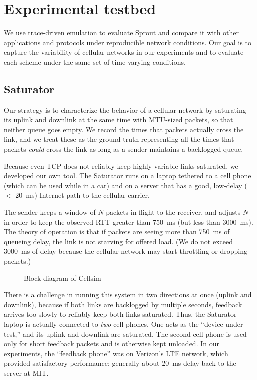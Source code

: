 \section{Experimental testbed}
\label{s:impl}
\label{ss:platform}
We use trace-driven emulation to evaluate Sprout and compare it with
other applications and protocols under reproducible network
conditions. Our goal is to capture the variability of cellular
networks in our experiments and to evaluate each scheme under the same
set of time-varying conditions.

\subsection{Saturator} Our strategy is to characterize the behavior
of a cellular network by saturating its uplink and downlink at the
same time with MTU-sized packets, so that neither queue goes empty. We
record the times that packets actually cross the link, and we treat
these as the ground truth representing all the times that packets
\emph{could} cross the link as long as a sender maintains a backlogged
queue.

Because even TCP does not reliably keep highly variable links
saturated, we developed our own tool. The Saturator runs on a laptop
tethered to a cell phone (which can be used while in a car) and on a
server that has a good, low-delay ($<$ 20~ms) Internet path to the
cellular carrier.

The sender keeps a window of $N$ packets in flight to the receiver,
and adjusts $N$ in order to keep the observed RTT greater than 750~ms
(but less than 3000~ms). The theory of operation is that if packets
are seeing more than 750~ms of queueing delay, the link is not
starving for offered load. (We do not exceed 3000~ms of delay because
the cellular network may start throttling or dropping packets.)

\begin{figure}
  \caption{Block diagram of Cellsim}
\hspace{\baselineskip}

\noindent \def\svgwidth{\columnwidth}

\label{f:cellsim}

\end{figure}

There is a challenge in running this system in two directions at once
(uplink and downlink), because if both links are backlogged by
multiple seconds, feedback arrives too slowly to reliably keep both
links saturated. Thus, the Saturator laptop is actually connected to
\emph{two} cell phones. One acts as the ``device under test,'' and its
uplink and downlink are saturated.  The second cell phone is used only
for short feedback packets and is otherwise kept unloaded. In our
experiments, the ``feedback phone'' was on Verizon's LTE network,
which provided satisfactory performance: generally about 20~ms delay
back to the server at MIT.


